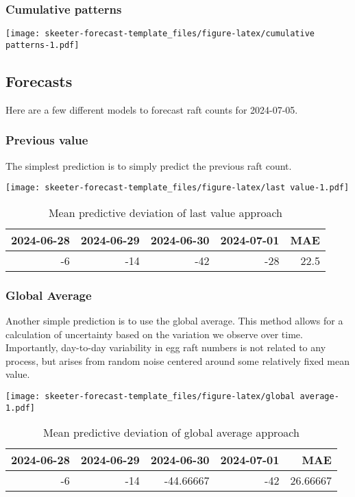 \documentclass[
]{article}
\begin{document}
\subsubsection{Cumulative patterns}\label{cumulative-patterns}

\texttt{[image: skeeter-forecast-template\_files/figure-latex/cumulative patterns-1.pdf]}

\subsection{Forecasts}\label{forecasts}

Here are a few different models to forecast raft counts for 2024-07-05.

\subsubsection{Previous value}\label{previous-value}

The simplest prediction is to simply predict the previous raft count.

\texttt{[image: skeeter-forecast-template\_files/figure-latex/last value-1.pdf]}

\begin{longtable}[t]{rrrrr}
\caption{\label{tab:last value accuracy}Mean predictive deviation of last value approach}\\
\toprule
2024-06-28 & 2024-06-29 & 2024-06-30 & 2024-07-01 & MAE\\
\midrule
-6 & -14 & -42 & -28 & 22.5\\
\bottomrule
\end{longtable}

\subsubsection{Global Average}\label{global-average}

Another simple prediction is to use the global average. This method
allows for a calculation of uncertainty based on the variation we
observe over time. Importantly, day-to-day variability in egg raft
numbers is not related to any process, but arises from random noise
centered around some relatively fixed mean value.

\texttt{[image: skeeter-forecast-template\_files/figure-latex/global average-1.pdf]}

\begin{longtable}[t]{rrrrr}
\caption{\label{tab:global average accuracy}Mean predictive deviation of global average approach}\\
\toprule
2024-06-28 & 2024-06-29 & 2024-06-30 & 2024-07-01 & MAE\\
\midrule
-6 & -14 & -44.66667 & -42 & 26.66667\\
\bottomrule
\end{longtable}
\end{document}
